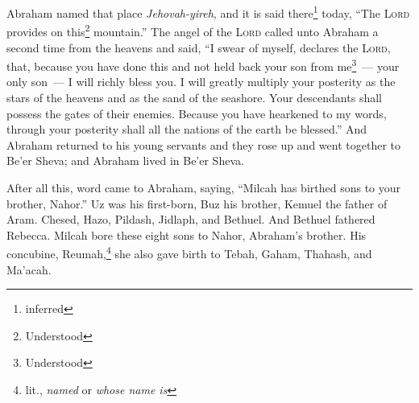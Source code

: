\begin{inparaenum}
     Abraham named that place \textit{Jehovah-yireh}, and it is said there\footnote{inferred} today, ``The \textsc{Lord} provides on this\footnote{Understood} mountain.''%
     The angel of the \textsc{Lord} called unto Abraham a second time from the heavens%
     and said, ``I swear of myself, declares the \textsc{Lord}, that, because you have done this and not held back your son from me\footnote{Understood}~--- your only son~---%
     I will richly bless you. I will greatly multiply your posterity as the stars of the heavens and as the sand of the seashore. Your descendants shall possess the gates of their enemies.%
     Because you have hearkened to my words, through your posterity shall all the nations of the earth be blessed.''%
     And Abraham returned to his young servants and they rose up and went together to Be'er Sheva; and Abraham lived in Be'er Sheva.%
    
     After all this, word came to Abraham, saying, ``Milcah has birthed sons to your brother, Nahor.''%
     Uz was his first-born, Buz his brother, Kemuel the father of Aram.%
     Chesed, Hazo, Pildash, Jidlaph, and Bethuel.%
     And Bethuel fathered Rebecca. Milcah bore these eight sons to Nahor, Abraham's brother.%
     His concubine, Reumah,\footnote{lit., \textit{named} or \textit{whose name is}} she also gave birth to Tebah, Gaham, Thahash, and Ma'acah.%
\end{inparaenum}
